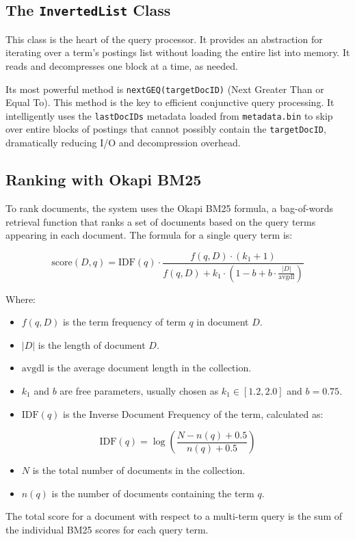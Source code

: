 \documentclass[11pt, a4paper]{report}
\begin{document}
\subsection{The \texttt{InvertedList} Class}
This class is the heart of the query processor. It provides an abstraction for iterating over a term's postings list without loading the entire list into memory. It reads and decompresses one block at a time, as needed.

Its most powerful method is \lstinline{nextGEQ(targetDocID)} (Next Greater Than or Equal To). This method is the key to efficient conjunctive query processing. It intelligently uses the \lstinline{lastDocIDs} metadata loaded from \lstinline{metadata.bin} to skip over entire blocks of postings that cannot possibly contain the \lstinline{targetDocID}, dramatically reducing I/O and decompression overhead.

\subsection{Ranking with Okapi BM25}
To rank documents, the system uses the Okapi BM25 formula, a bag-of-words retrieval function that ranks a set of documents based on the query terms appearing in each document. The formula for a single query term is:

\begin{equation}
\text{score}(D, q) = \text{IDF}(q) \cdot \frac{f(q, D) \cdot (k_1 + 1)}{f(q, D) + k_1 \cdot \left(1 - b + b \cdot \frac{|D|}{\text{avgdl}}\right)}
\end{equation}

Where:
\begin{itemize}
    \item $f(q, D)$ is the term frequency of term $q$ in document $D$.
    \item $|D|$ is the length of document $D$.
    \item $\text{avgdl}$ is the average document length in the collection.
    \item $k_1$ and $b$ are free parameters, usually chosen as $k_1 \in [1.2, 2.0]$ and $b=0.75$.
    \item $\text{IDF}(q)$ is the Inverse Document Frequency of the term, calculated as:
\end{itemize}
\begin{equation}
\text{IDF}(q) = \log\left(\frac{N - n(q) + 0.5}{n(q) + 0.5}\right)
\end{equation}
\begin{itemize}
    \item $N$ is the total number of documents in the collection.
    \item $n(q)$ is the number of documents containing the term $q$.
\end{itemize}
The total score for a document with respect to a multi-term query is the sum of the individual BM25 scores for each query term.
\end{document}
